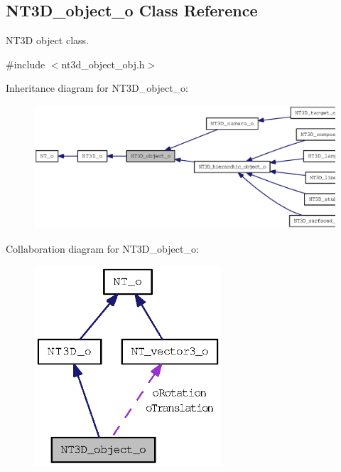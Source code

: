 \subsection{NT3D\_\-object\_\-o Class Reference}
\label{class_n_t3_d__object__o}


NT3D object class.  




{\ttfamily \#include $<$nt3d\_\-object\_\-obj.h$>$}



Inheritance diagram for NT3D\_\-object\_\-o:
\nopagebreak
\begin{figure}[H]
\begin{center}
\leavevmode
\includegraphics[width=400pt]{class_n_t3_d__object__o__inherit__graph}
\end{center}
\end{figure}


Collaboration diagram for NT3D\_\-object\_\-o:
\nopagebreak
\begin{figure}[H]
\begin{center}
\leavevmode
\includegraphics[width=198pt]{class_n_t3_d__object__o__coll__graph}
\end{center}
\end{figure}
